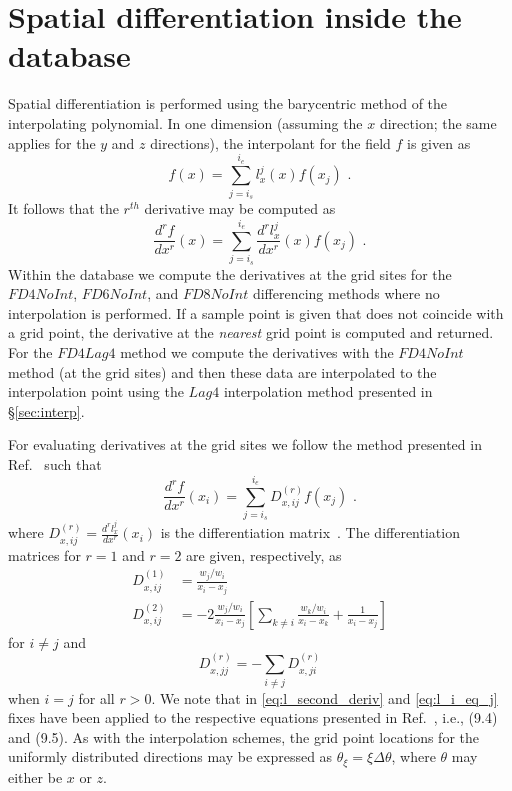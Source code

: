 \documentclass[11pt,letterpaper]{article}
\begin{document}
\section{Spatial differentiation inside the database}
Spatial differentiation is performed using the barycentric method of the interpolating polynomial. In one dimension (assuming the $x$ direction; the same applies for the $y$ and $z$ directions), the interpolant for the field $f$ is given as
\begin{equation}
f(x) = \sum_{j=i_s}^{i_e} l^{j}_x(x) f(x_j) \text{ .}
\end{equation}
It follows that the $r^{th}$ derivative may be computed as
\begin{equation}
\frac{d^rf}{dx^r}(x) = \sum_{j=i_s}^{i_e} \frac{d^r l^{j}_x}{dx^r}(x) f(x_j) \text{ .}
\end{equation}
Within the database we compute the derivatives at the grid sites for the $FD4NoInt$, $FD6NoInt$, and $FD8NoInt$ differencing methods where no interpolation is performed. If a sample point is given that does not coincide with a grid point, the derivative at the \textit{nearest} grid point is computed and returned. For the $FD4Lag4$ method we compute the derivatives with the $FD4NoInt$ method (at the grid sites) and then these data are interpolated to the interpolation point using the $Lag4$ interpolation method presented in \S\ref{sec:interp}. 

For evaluating derivatives at the grid sites we follow the method presented in Ref.~\cite{Berrut2004} such that
\begin{equation}
\frac{d^rf}{dx^r}(x_i) = \sum_{j=i_s}^{i_e} D^{(r)}_{x,ij} f(x_j) \text{ .}
\end{equation}
where $D^{(r)}_{x,ij} = \frac{d^r l^{j}_x}{dx^r}(x_i)$ is the differentiation matrix~\cite{Berrut2004}. The differentiation matrices for $r=1$ and $r=2$ are given, respectively, as
\begin{align}
D^{(1)}_{x,ij} &= \frac{w_j / w_i}{x_i - x_j} \\\label{eq:l_second_deriv}
D^{(2)}_{x,ij} &= -2\frac{w_j / w_i}{x_i - x_j}\left[\sum_{k \neq i} \frac{w_k / w_i}{x_i - x_k} + \frac{1}{x_i-x_j}\right]
\end{align}
for $i \neq j$ and
\begin{equation}\label{eq:l_i_eq_j}
D^{(r)}_{x,jj} = -\sum_{i\neq j} D^{(r)}_{x,ji}
\end{equation}
when $i = j$ for all $r>0$. We note that in \eqref{eq:l_second_deriv} and \eqref{eq:l_i_eq_j} fixes have been applied to the respective equations presented in Ref.~\cite{Berrut2004}, i.e., (9.4) and (9.5). As with the interpolation schemes, the grid point locations for the uniformly distributed directions may be expressed as $\theta_\xi = \xi \Delta\theta$, where $\theta$ may either be $x$ or $z$. 
\end{document}
